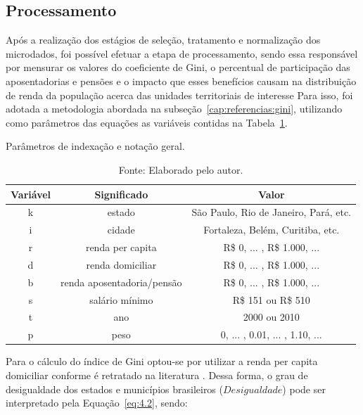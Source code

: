 \subsection{Processamento}

Após a realização dos estágios de seleção, tratamento e normalização dos microdados, foi possível efetuar a etapa de processamento, sendo essa responsável por mensurar os valores do coeficiente de Gini, o percentual de participação das aposentadorias e pensões e o impacto que esses benefícios causam na distribuição de renda da população acerca das unidades territoriais de interesse Para isso, foi adotada a metodologia abordada na subseção~\ref{cap:referencias:gini}, utilizando como parâmetros das equações as variáveis contidas na Tabela~\ref{tab:cap04:parametros}.  

\begin{table}[!ht]
    \centering
    \caption{Parâmetros de indexação e notação geral.} 
    \begin{tabular}{|c|c|c|}
        \hline
        Variável & Significado                & Valor                                 \\ \hline
        k        & estado                     & São Paulo, Rio de Janeiro, Pará, etc. \\ \hline
        i        & cidade                     & Fortaleza, Belém, Curitiba, etc.      \\ \hline
        r        & renda per capita           & R\$ 0, ... , R\$ 1.000, ...           \\ \hline
        d        & renda domiciliar           & R\$ 0, ... , R\$ 1.000, ...           \\ \hline
        b        & renda aposentadoria/pensão & R\$ 0, ... , R\$ 1.000, ...           \\ \hline
        s        & salário mínimo             & R\$ 151 ou R\$ 510                    \\ \hline
        t        & ano                        & 2000 ou 2010                          \\ \hline
        p        & peso                       & 0, ... , 0.01, ... , 1.10, ...        \\ \hline
    \end{tabular}
    \caption*{\footnotesize{Fonte: Elaborado pelo autor.}}
    \label{tab:cap04:parametros}
\end{table}

Para o cálculo do índice de Gini optou-se por utilizar a renda per capita domiciliar conforme é retratado na literatura \cite{cap02_ref22, cap04_ref10, cap04_ref11, cap04_ref8, cap04_ref1, cap02_ref2}. Dessa forma, o grau de desigualdade dos estados e municípios brasileiros ($Desigualdade$) pode ser interpretado pela Equação~\ref{eq:4.2}, sendo: 

